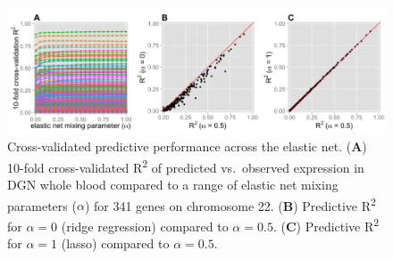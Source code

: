 \documentclass[]{article}
\begin{document}
\begin{figure}[htbp]
\centering
\includegraphics{GenArch_manuscript_files/figure-latex/EN-1.pdf}
\caption{Cross-validated predictive performance across the elastic net.
(\textbf{A}) 10-fold cross-validated R\textsuperscript{2} of predicted
vs.~observed expression in DGN whole blood compared to a range of
elastic net mixing parameters ($\alpha$) for 341 genes on chromosome 22.
(\textbf{B}) Predictive R\textsuperscript{2} for $\alpha = 0$ (ridge
regression) compared to $\alpha = 0.5$. (\textbf{C}) Predictive
R\textsuperscript{2} for $\alpha = 1$ (lasso) compared to
$\alpha = 0.5$.}
\end{figure}
\end{document}
